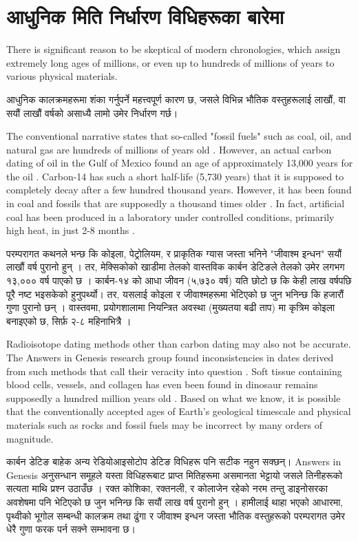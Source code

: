 \documentclass[10pt,twocolumn,letterpaper]{article}
\begin{document}
\section{आधुनिक मिति निर्धारण विधिहरूका बारेमा}

There is significant reason to be skeptical of modern chronologies, which assign extremely long ages of millions, or even up to hundreds of millions of years to various physical materials.

आधुनिक कालक्रमहरूमा शंका गर्नुपर्ने महत्त्वपूर्ण कारण छ, जसले विभिन्न भौतिक वस्तुहरूलाई लाखौं, वा सयौं लाखौं वर्षको असाध्यै लामो उमेर निर्धारण गर्छ।

The conventional narrative states that so-called "fossil fuels" such as coal, oil, and natural gas are hundreds of millions of years old \cite{104}. However, an actual carbon dating of oil in the Gulf of Mexico found an age of approximately 13,000 years for the oil \cite{105}. Carbon-14 has such a short half-life (5,730 years) that it is supposed to completely decay after a few hundred thousand years. However, it has been found in coal and fossils that are supposedly a thousand times older \cite{106}. In fact, artificial coal has been produced in a laboratory under controlled conditions, primarily high heat, in just 2-8 months \cite{107}.

परम्परागत कथनले भन्छ कि कोइला, पेट्रोलियम, र प्राकृतिक ग्यास जस्ता भनिने "जीवाश्म इन्धन" सयौं लाखौं वर्ष पुरानो हुन् \cite{104}। तर, मेक्सिकोको खाडीमा तेलको वास्तविक कार्बन डेटिङले तेलको उमेर लगभग १३,००० वर्ष पाएको छ \cite{105}। कार्बन-१४ को आधा जीवन (५,७३० वर्ष) यति छोटो छ कि केही लाख वर्षपछि पूरै नष्ट भइसकेको हुनुपर्थ्यो। तर, यसलाई कोइला र जीवाश्‍महरूमा भेटिएको छ जुन भनिन्छ कि हजारौं गुणा पुरानो छन् \cite{106}। वास्तवमा, प्रयोगशालामा नियन्त्रित अवस्था (मुख्यतया बढी ताप) मा कृत्रिम कोइला बनाइएको छ, सिर्फ़ २-८ महिनाभित्रै \cite{107}।

Radioisotope dating methods other than carbon dating may also not be accurate. The Answers in Genesis research group found inconsistencies in dates derived from such methods that call their veracity into question \cite{108}. Soft tissue containing blood cells, vessels, and collagen has even been found in dinosaur remains supposedly a hundred million years old \cite{109,110}. Based on what we know, it is possible that the conventionally accepted ages of Earth's geological timescale and physical materials such as rocks and fossil fuels may be incorrect by many orders of magnitude.

कार्बन डेटिङ बाहेक अन्य रेडियोआइसोटोप डेटिङ विधिहरू पनि सटीक नहुन सक्छन्। Answers in Genesis अनुसन्धान समूहले यस्ता विधिहरूबाट प्राप्त मितिहरूमा असमानता भेट्टायो जसले तिनीहरूको सत्यता माथि प्रश्न उठाउँछ \cite{108}। रक्त कोशिका, रक्तनली, र कोलाजेन रहेको नरम तन्तु डाइनोसरका अवशेषमा पनि भेटिएको छ जुन भनिन्छ कि सयौं लाख वर्ष पुरानो हुन् \cite{109,110}। हामीलाई थाहा भएको आधारमा, पृथ्वीको भूगोल सम्बन्धी कालक्रम तथा ढुंगा र जीवाश्म इन्धन जस्ता भौतिक वस्तुहरूको परम्परागत उमेर धेरै गुणा फरक पर्न सक्ने सम्भावना छ।
\end{document}
